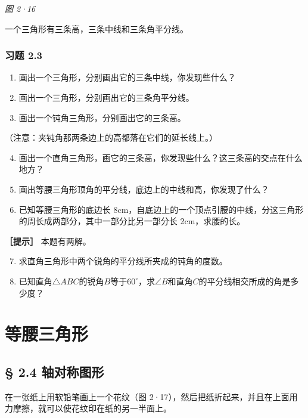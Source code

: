 \emph{图 2·16}

一个三角形有三条高，三条中线和三条角平分线。

\subsubsection{习题 2.3}

\begin{enumerate}
\item
  画出一个三角形，分别画出它的三条中线，你发现些什么？
\item
  画出一个三角形，分别画出它的三条角平分线。
\item
  画出一个钝角三角形，分别画出它的三条高。
\end{enumerate}

（注意：夹钝角那两条边上的高都落在它们的延长线上。）

\begin{enumerate}
\setcounter{enumi}{3}
\item
  画出一个直角三角形，画它的三条高，你发现些什么？这三条高的交点在什么地方？
\item
  画出等腰三角形顶角的平分线，底边上的中线和高，你发现了什么？
\item
  已知等腰三角形的底边长
  8cm，自底边上的一个顶点引腰的中线，分这三角形的周长成两部分，其中一部分比另一部分长
  2cm，求腰的长。
\end{enumerate}

\textbf{［提示］} 本题有两解。

\begin{enumerate}
\setcounter{enumi}{6}
\item
  求直角三角形中两个锐角的平分线所夹成的钝角的度数。
\item
  已知直角\(\triangle ABC\)的锐角\(B\)等于\(60^{\circ}\)，求\(\angle B\)和直角\(C\)的平分线相交所成的角是多少度？
\end{enumerate}

\section{等腰三角形}

\subsection{§ 2.4 轴对称图形}

在一张纸上用软铅笔画上一个花纹（图
2·17），然后把纸折起来，并且在上面用力摩擦，就可以使花纹印在纸的另一半面上。

